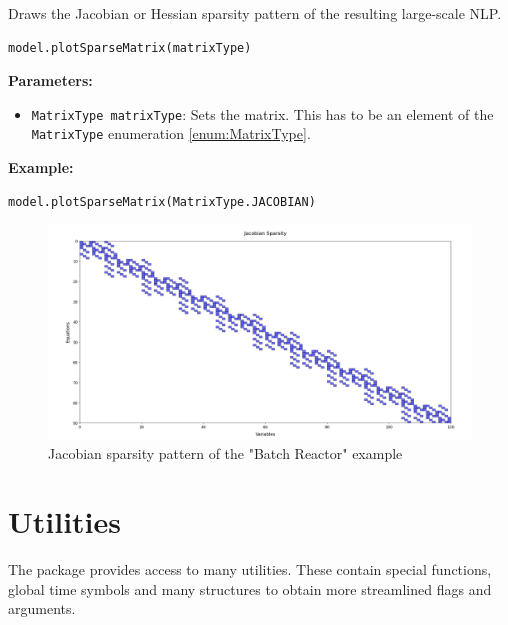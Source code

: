 \documentclass[12pt]{article}
\begin{document}
\begin{mdframed}[backgroundcolor=gray!10, roundcorner=10pt,
		linewidth=1pt]

	Draws the Jacobian or Hessian sparsity pattern of the resulting
	large-scale NLP.

	\begin{lstlisting}
model.plotSparseMatrix(matrixType)
		\end{lstlisting}
	\label{plotSparseMatrix}
	\textbf{Parameters:}
	\begin{itemize}
		\item \texttt{MatrixType matrixType}: Sets the matrix. This has
		      to be an element of the \texttt{MatrixType} enumeration
		      \eqref{enum:MatrixType}.
	\end{itemize}

	\textbf{Example:}
	\begin{lstlisting}
model.plotSparseMatrix(MatrixType.JACOBIAN)   
\end{lstlisting}
	\begin{figure}[H]
		\centering
		\includegraphics[width=1\textwidth]{images/sparse.png}
		\caption{Jacobian sparsity pattern of the "Batch Reactor" example}
		\label{fig:sparseBatch}
	\end{figure}
\end{mdframed}

\section{Utilities}
The package provides access to many utilities.
These contain special functions, global time symbols and many structures to
obtain more streamlined flags and arguments.
\end{document}

